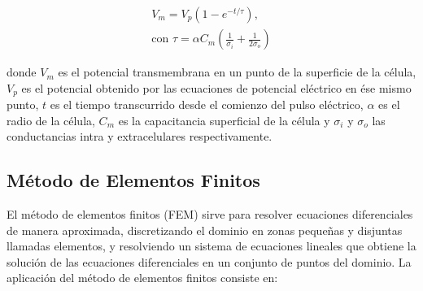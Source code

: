 \documentclass[a4paper,10pt]{article}
\begin{document}
\begin{equation} \label{eq:capacit} \begin{split}
	V_m = V_p (1 - e^{-t/\tau}) , \\ \textrm{con } \tau = \alpha C_m \left( \frac{1}{\sigma_i} + \frac{1}{2 \sigma_o} \right)
\end{split} \end{equation}

donde $V_m$ es el potencial transmembrana en un punto de la superficie de la célula, $V_p$ es el potencial obtenido por las ecuaciones de potencial eléctrico en ése mismo punto, $t$ es el tiempo transcurrido desde el comienzo del pulso eléctrico, $\alpha$ es el radio de la célula, $C_m$ es la capacitancia superficial de la célula y $\sigma_i$ y $\sigma_o$ las conductancias intra y extracelulares respectivamente.\\

\subsection{Método de Elementos Finitos}
El método de elementos finitos (FEM) sirve para resolver ecuaciones diferenciales de manera aproximada, discretizando el dominio en zonas pequeñas y disjuntas llamadas elementos, y resolviendo un sistema de ecuaciones lineales que obtiene la solución de las ecuaciones diferenciales en un conjunto de puntos del dominio. La aplicación del método de elementos finitos consiste en:
\end{document}
